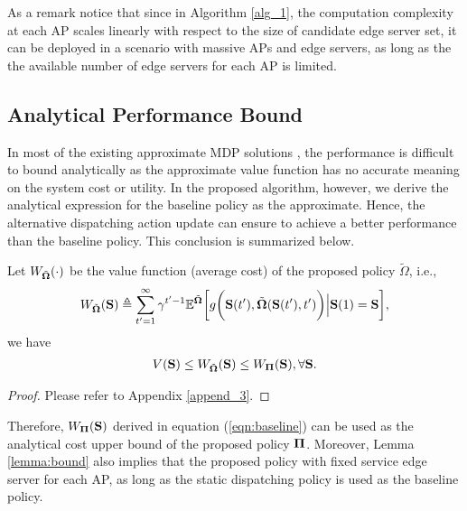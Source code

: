 As a remark notice that since in Algorithm \ref{alg_1}, the computation complexity at each AP scales linearly with respect to {the size of candidate edge server set}, it can be deployed in a scenario with massive APs and edge servers, as long as the {the available number of edge servers for each AP} is limited.

\subsection{Analytical Performance Bound}
\label{subsec:analysis}
In most of the existing approximate MDP solutions \cite{mdp-bound1,mdp-bound2,mdp-bound3}, the performance is difficult to bound analytically as the approximate value function has no accurate meaning on the system cost or utility.
In the proposed algorithm, however, we derive the analytical expression for the baseline policy as the approximate.
Hence, the alternative dispatching action update can ensure to achieve a better performance than the baseline policy.
This conclusion is summarized below.
\begin{lemma}
    \label{lemma:bound}
    Let $W_{\tilde{\boldsymbol{\Omega}}}(\cdot)$ be the value function (average cost) of the proposed policy $\tilde{\Omega}$, i.e.,
    \begin{align}
        W_{\tilde{\boldsymbol{\Omega}}}(\mathbf{S}) \triangleq
        \sum_{t'=1}^{\infty} \gamma^{t'-1} \mathbb{E}^{ \tilde{\boldsymbol{\Omega}} } \bigg[
            g\bigg(\mathbf{S}(t'), \tilde{\boldsymbol{\Omega}}(\mathbf{S}(t'),t')\bigg) \Big| \mathbf{S}(1)=\mathbf{S}
        \bigg],
    \end{align}
    we have
    \begin{align}
        V(\mathbf{S})
        \leq W_{\tilde{\boldsymbol{\Omega}}}(\mathbf{S})
        \leq W_{\boldsymbol{\Pi}}(\mathbf{S}),
        \forall \mathbf{S}.
    \end{align}
\end{lemma}
\begin{proof}
    Please refer to Appendix \ref{append_3}.
\end{proof}
Therefore, $W_{\boldsymbol{\Pi}}(\mathbf{S})$ derived in equation (\ref{eqn:baseline}) can be used as the analytical cost upper bound of the proposed policy $\boldsymbol{\Pi}$.
Moreover, Lemma \ref{lemma:bound} also implies that the proposed policy with fixed service edge server for each AP, as long as the {static dispatching policy} is used as the baseline policy.

